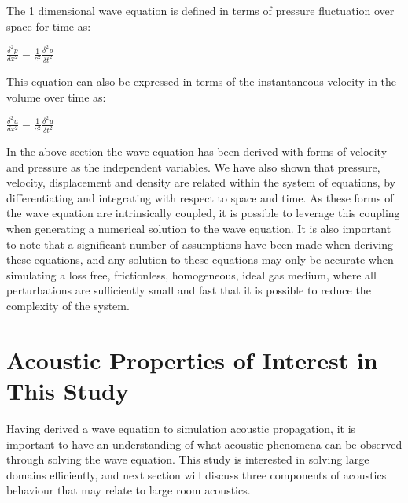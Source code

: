 The 1 dimensional wave equation is defined in terms of pressure fluctuation over space for time as:
\begin{center}
 $\frac{\delta^2 p}{\delta x^2}=\frac{1}{c^2}\frac{\delta^2 p}{\delta t^2}$\\
\end{center}
This equation can also be expressed in terms of the instantaneous velocity in the volume over time as:
\begin{center}
 $\frac{\delta^2 u}{\delta x^2}=\frac{1}{c^2}\frac{\delta^2 u}{\delta t^2}$\\
\end{center}

In the above section the wave equation has been derived with forms of velocity and pressure as the independent variables. We have also shown that pressure, velocity, displacement and density are related within the system of equations, by differentiating and integrating with respect to space and time. As these forms of the wave equation are intrinsically coupled, it is possible to leverage this coupling when generating a numerical solution to the wave equation. It is also important to note that a significant number of assumptions have been made when deriving these equations, and any solution to these equations may only be accurate when simulating a loss free, frictionless, homogeneous, ideal gas medium, where all perturbations are sufficiently small and fast that it is possible to reduce the complexity of the system.\\

\section{Acoustic Properties of Interest in This Study}
Having derived a wave equation to simulation acoustic propagation, it is important to have an understanding of what acoustic phenomena can be observed through solving the wave equation. This study is interested in solving large domains efficiently, and next section will discuss three components of acoustics behaviour that may relate to large room acoustics.\\

